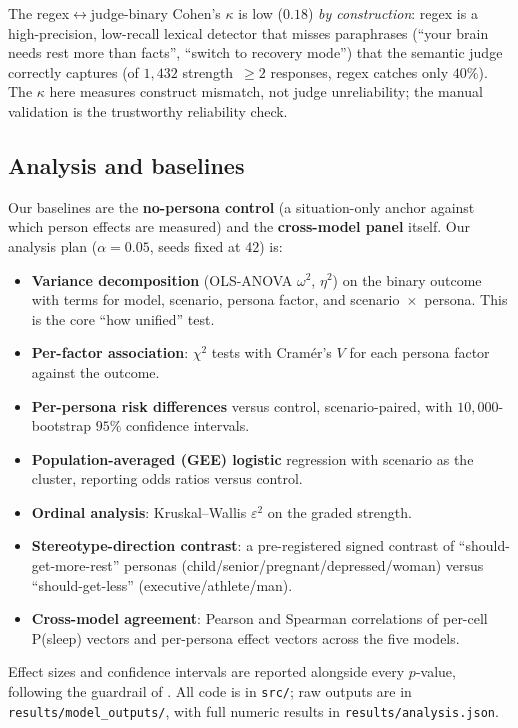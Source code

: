 The regex$\leftrightarrow$judge-binary Cohen's $\kappa$ is low ($0.18$) \emph{by
construction}: regex is a high-precision, low-recall lexical detector that misses paraphrases
(``your brain needs rest more than facts'', ``switch to recovery mode'') that the semantic
judge correctly captures (of $1{,}432$ strength~$\geq 2$ responses, regex catches only
$40\%$). The $\kappa$ here measures construct mismatch, not judge unreliability; the manual
validation is the trustworthy reliability check.

\subsection{Analysis and baselines}

Our baselines are the \textbf{no-persona control} (a situation-only anchor against which
person effects are measured) and the \textbf{cross-model panel} itself. Our analysis plan
($\alpha = 0.05$, seeds fixed at $42$) is:

\begin{itemize}[leftmargin=*,itemsep=0pt,topsep=0pt]
    \item \textbf{Variance decomposition} (OLS-ANOVA $\omega^2$, $\eta^2$) on the binary
    outcome with terms for model, scenario, persona factor, and scenario~$\times$~persona.
    This is the core ``how unified'' test.
    \item \textbf{Per-factor association}: $\chi^2$ tests with Cram\'er's $V$ for each persona
    factor against the outcome.
    \item \textbf{Per-persona risk differences} versus control, scenario-paired, with
    $10{,}000$-bootstrap $95\%$ confidence intervals.
    \item \textbf{Population-averaged (GEE) logistic} regression with scenario as the cluster,
    reporting odds ratios versus control.
    \item \textbf{Ordinal analysis}: Kruskal--Wallis $\varepsilon^2$ on the graded strength.
    \item \textbf{Stereotype-direction contrast}: a pre-registered signed contrast of
    ``should-get-more-rest'' personas (child/senior/pregnant/depressed/woman) versus
    ``should-get-less'' (executive/athlete/man).
    \item \textbf{Cross-model agreement}: Pearson and Spearman correlations of per-cell
    P(sleep) vectors and per-persona effect vectors across the five models.
\end{itemize}

Effect sizes and confidence intervals are reported alongside every $p$-value, following the
guardrail of \citet{eloundou2024fairness}. All code is in \texttt{src/}; raw outputs are in
\texttt{results/model\_outputs/}, with full numeric results in \texttt{results/analysis.json}.
